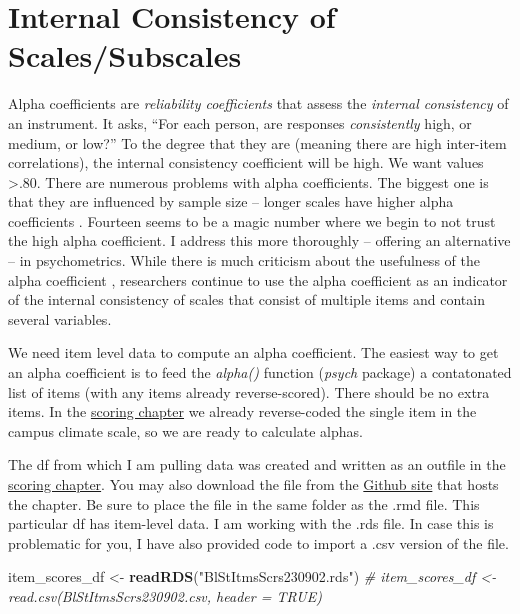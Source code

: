 \documentclass[
  11pt,
]{book}
\newenvironment{Shaded}{\begin{snugshade}}{\end{snugshade}}
\newcommand{\CommentTok}[1]{\textcolor[rgb]{0.37,0.37,0.37}{\textit{#1}}}
\newcommand{\FunctionTok}[1]{\textcolor[rgb]{0.27,0.27,0.27}{\textbf{#1}}}
\newcommand{\NormalTok}[1]{#1}
\newcommand{\OtherTok}[1]{\textcolor[rgb]{0.37,0.37,0.37}{#1}}
\newcommand{\StringTok}[1]{\textcolor[rgb]{0.5,0.5,0.5}{#1}}
\begin{document}
\hypertarget{internal-consistency-of-scalessubscales}{%
\section{Internal Consistency of Scales/Subscales}\label{internal-consistency-of-scalessubscales}}

Alpha coefficients are \emph{reliability coefficients} that assess the \emph{internal consistency} of an instrument. It asks, ``For each person, are responses \emph{consistently} high, or medium, or low?'' To the degree that they are (meaning there are high inter-item correlations), the internal consistency coefficient will be high. We want values \textgreater.80. There are numerous problems with alpha coefficients. The biggest one is that they are influenced by sample size -- longer scales have higher alpha coefficients \citep{cortina_what_1993}. Fourteen seems to be a magic number where we begin to not trust the high alpha coefficient. I address this more thoroughly -- offering an alternative -- in psychometrics. While there is much criticism about the usefulness of the alpha coefficient \citep{sijtsma_use_2009}, researchers continue to use the alpha coefficient as an indicator of the internal consistency of scales that consist of multiple items and contain several variables.

We need item level data to compute an alpha coefficient. The easiest way to get an alpha coefficient is to feed the \emph{alpha()} function (\emph{psych} package) a contatonated list of items (with any items already reverse-scored). There should be no extra items. In the \protect\hyperlink{score}{scoring chapter} we already reverse-coded the single item in the campus climate scale, so we are ready to calculate alphas.

The df from which I am pulling data was created and written as an outfile in the \protect\hyperlink{score}{scoring chapter}. You may also download the file from the \href{https://github.com/lhbikos/ReC_MultivModel}{Github site} that hosts the chapter. Be sure to place the file in the same folder as the .rmd file. This particular df has item-level data. I am working with the .rds file. In case this is problematic for you, I have also provided code to import a .csv version of the file.

\begin{Shaded}
\begin{Highlighting}[]
\NormalTok{item\_scores\_df }\OtherTok{\textless{}{-}} \FunctionTok{readRDS}\NormalTok{(}\StringTok{"BlStItmsScrs230902.rds"}\NormalTok{)}
\CommentTok{\# item\_scores\_df \textless{}{-} read.csv(\textquotesingle{}BlStItmsScrs230902.csv\textquotesingle{}, header = TRUE)}
\end{Highlighting}
\end{Shaded}
\end{document}
